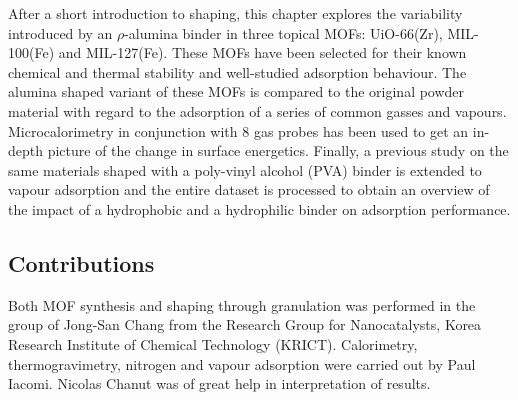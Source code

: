 After a short introduction to shaping, this chapter explores the 
variability introduced by an \( \rho \)-alumina binder in three 
topical MOFs: UiO-66(Zr), MIL-100(Fe) and MIL-127(Fe). These MOFs 
have been selected for their known chemical and thermal stability 
and well-studied adsorption behaviour.
The alumina shaped variant of these MOFs is compared to the original
powder material with regard to the adsorption of a series of common
gasses and vapours. Microcalorimetry in conjunction with 8 gas probes
has been used to get an in-depth picture of the change in surface
energetics.
Finally, a previous study on the same materials shaped with a poly-vinyl
alcohol (PVA) binder is extended to vapour adsorption and the entire
dataset is processed to obtain an overview of the impact of a
hydrophobic and a hydrophilic binder on adsorption performance.

\subsection*{Contributions}

Both MOF synthesis and shaping through granulation was performed in
the group of Jong-San Chang from the Research Group for Nanocatalysts,
Korea Research Institute of Chemical Technology (KRICT). Calorimetry,
thermogravimetry, nitrogen and vapour adsorption were carried out by
Paul Iacomi. Nicolas Chanut was of great help in interpretation 
of results.

